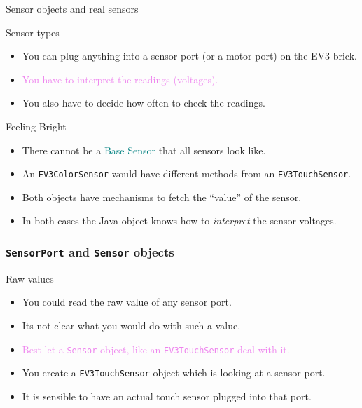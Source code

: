 \documentclass[color=pdftex,usenames,dvipsnames, aspectratio=169]{beamer}
\begin{document}
\begin{frame}{Sensor objects and real sensors}
\begin{block}{Sensor types}
\begin{itemize}
\item You can plug anything into a sensor port (or a motor port) on the EV3 brick.
\item \textcolor{violet}{You have to interpret the readings (voltages).}
\item You also have to decide how often to check the readings.
\end{itemize}
\end{block}

\begin{block}{Feeling Bright}
\begin{itemize}
\item \alert{There cannot be a} \textcolor{teal}{Base Sensor} that all sensors look like.
\item An \lstinline!EV3ColorSensor! would have different methods from an \lstinline!EV3TouchSensor!.
\item Both \alert{objects} have \alert{mechanisms} to fetch the ``value'' of the sensor.
\item In both cases the \alert{Java object} knows how to \emph{interpret} the sensor voltages.
\end{itemize}
\end{block}
\end{frame}

\begin{frame}[label=rawValues]
\frametitle{\lstinline!SensorPort! and \lstinline!Sensor! objects}
\begin{block}{Raw values}
\begin{itemize}
\item You could read the raw value of any sensor port.
\item Its not clear what you would do with such a value.
\item \textcolor{violet}{Best let a \lstinline!Sensor! object, like an \lstinline!EV3TouchSensor! deal with it.}
\item You create a \lstinline!EV3TouchSensor! object which is looking at a sensor port.
\item It is sensible to have an actual touch sensor  plugged into that port.
\end{itemize}
\end{block}
\end{frame}
\end{document}
